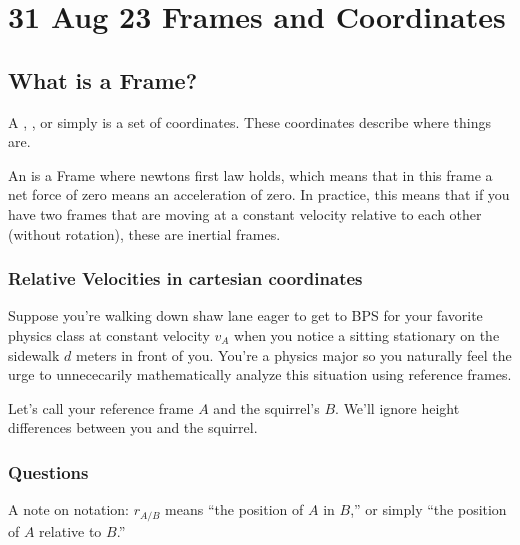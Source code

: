 \documentclass[letterpaper,10pt,english]{jupyterBook}
\begin{document}
\chapter{31 Aug 23 \sphinxhyphen{} Frames and Coordinates}
\label{\detokenize{content/1_mechanics/frames:aug-23-frames-and-coordinates}}\label{\detokenize{content/1_mechanics/frames::doc}}

\section{What is a Frame?}
\label{\detokenize{content/1_mechanics/frames:what-is-a-frame}}
\sphinxAtStartPar
A , , or simply  is a set of coordinates. These coordinates describe where things are.

\sphinxAtStartPar
An  is a Frame where newtons first law holds, which means that in this frame a net force of zero means an acceleration of zero. In practice, this means that if you have two frames that are moving at a constant velocity relative to each other (without rotation), these are inertial frames.


\subsection{Relative Velocities in cartesian coordinates}
\label{\detokenize{content/1_mechanics/frames:relative-velocities-in-cartesian-coordinates}}
\sphinxAtStartPar
Suppose you’re walking down shaw lane eager to get to BPS for your favorite physics class at constant velocity \(v_A\) when you notice a  sitting stationary on the sidewalk \(d\) meters in front of you. You’re a physics major so you naturally feel the urge to unnececarily mathematically analyze this situation using reference frames.

\sphinxAtStartPar
Let’s call your reference frame \(A\) and the squirrel’s \(B\). We’ll ignore height differences between you and the squirrel.


\subsection{Questions}
\label{\detokenize{content/1_mechanics/frames:questions}}
\sphinxAtStartPar
A note on notation: \(r_{A/B}\) means “the position of  \(A\) in  \(B\),” or simply “the position of \(A\) relative to \(B\).”
\end{document}
